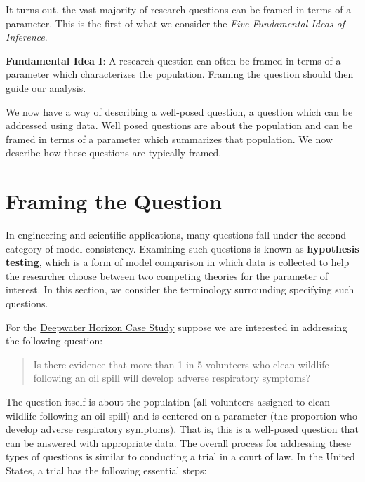 \documentclass[
]{book}
\theoremstyle{plain}
\theoremstyle{mydefn}
\theoremstyle{myexmpl}
\theoremstyle{remark}
\begin{document}
It turns out, the vast majority of research questions can be framed in terms of a parameter. This is the first of what we consider the \emph{Five Fundamental Ideas of Inference}.

\begin{rmdfivefund}
\textbf{Fundamental Idea I}: A research question can often be framed in terms of a parameter which characterizes the population. Framing the question should then guide our analysis.
\end{rmdfivefund}

We now have a way of describing a well-posed question, a question which can be addressed using data. Well posed questions are about the population and can be framed in terms of a parameter which summarizes that population. We now describe how these questions are typically framed.

\hypertarget{framing-the-question}{%
\section{Framing the Question}\label{framing-the-question}}

In engineering and scientific applications, many questions fall under the second category of model consistency. Examining such questions is known as \textbf{hypothesis testing}, which is a form of model comparison in which data is collected to help the researcher choose between two competing theories for the parameter of interest. In this section, we consider the terminology surrounding specifying such questions.

For the \protect\hyperlink{CaseDeepwater}{Deepwater Horizon Case Study} suppose we are interested in addressing the following question:

\begin{quote}
Is there evidence that more than 1 in 5 volunteers who clean wildlife following an oil spill will develop adverse respiratory symptoms?
\end{quote}

The question itself is about the population (all volunteers assigned to clean wildlife following an oil spill) and is centered on a parameter (the proportion who develop adverse respiratory symptoms). That is, this is a well-posed question that can be answered with appropriate data. The overall process for addressing these types of questions is similar to conducting a trial in a court of law. In the United States, a trial has the following essential steps:
\end{document}
